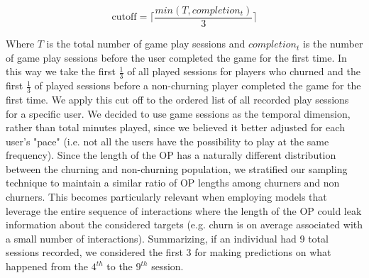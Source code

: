\begin{equation}
\label{cutoffop}
    \text{cutoff} = 
    \Biggl\lceil
        \dfrac
            {min(T, completion_t)}
            {3}
    \Biggr\rceil
\end{equation}

Where $T$ is the total number of game play sessions and $completion_t$ is the number of game play sessions before the user completed the game for the first time. In this way we take the first $\frac{1}{3}$ of all played sessions for players who churned and the first $\frac{1}{3}$ of played sessions before a non-churning player completed the game for the first time. We apply this cut off to the ordered list of all recorded play sessions for a specific user. We decided to use game sessions as the temporal dimension, rather than total minutes played, since we believed it better adjusted for each user's "pace" (i.e. not all the users have the possibility to play at the same frequency). Since the length of the OP has a naturally different distribution between the churning and non-churning population, we stratified our sampling technique to maintain a similar ratio of OP lengths among churners and non churners. This becomes particularly relevant when employing models that leverage the entire sequence of interactions where the length of the OP could leak information about the considered targets (e.g. churn is on average associated with a small number of interactions). Summarizing, if an individual had 9 total sessions recorded, we considered the first 3 for making predictions on what happened from the $4^{th}$ to the $9^{th}$ session. 

